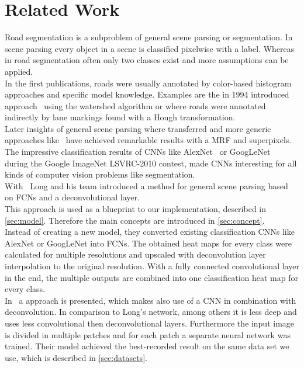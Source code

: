 
\section{Related Work}\label{sec:related-work}
Road segmentation is a subproblem of general scene parsing or segmentation. In
scene parsing every object in a scene is classified pixelwise with a label.
Whereas in road segmentation often only two classes exist and more assumptions
can be applied.\\
In the first publications, roads were usually annotated by color-based
histogram approaches and specific model knowledge. Examples are the in 1994
introduced approach~\cite{Beucher1990} using the watershed algorithm or
\cite{aly2008real} where roads were annotated indirectly by lane markings found
with a Hough transformation.\\
Later insights of general scene parsing where transferred and more generic
approaches like~\cite{6182716} have achieved remarkable results with a
\gls{MRF} and superpixels.\\ The impressive classification results of
\glspl{CNN} like AlexNet~\cite{krizhevsky2012imagenet} or
GoogLeNet~\cite{SzegedyLJSRAEVR14} during the Google ImageNet LSVRC-2010
contest, made \glspl{CNN} interesting for all kinds of computer vision problems
like segmentation.\\
With~\cite{long2014fully} Long and his team introduced a method for general
scene parsing based on \glspl{FCN} and a deconvolutional layer.\\
This approach is used as a blueprint to our implementation, described in
\cref{sec:model}. Therefore the main concepts are introduced in
\cref{sec:concept}.\\
Instead of creating a new model, they converted existing classification
\glspl{CNN} like AlexNet or GoogLeNet into \glspl{FCN}. The obtained heat maps for
every class were calculated for multiple resolutions and upscaled with
deconvolution layer interpolation to the original resolution. With a fully
connected convolutional layer in the end, the multiple outputs are combined
into one classification heat map for every class.\\

In~\cite{mohan2014deep} a approach is presented, which makes also use of a
\gls{CNN} in combination with deconvolution. In comparison to Long's network,
among others it is less deep and uses less convolutional then deconvolutional
layers. Furthermore the input image is divided in multiple patches and for each
patch a separate neural network was trained. Their model achieved the
best-recorded result on the same data set we use, which is described in
\cref{sec:datasets}.


